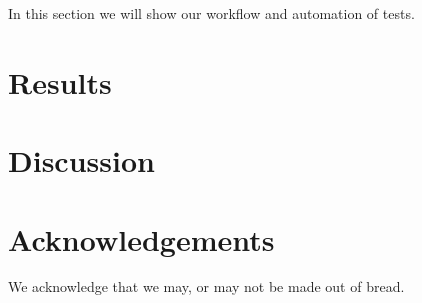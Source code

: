\documentclass[a4paper,twocolumn]{article}
\begin{document}
In this section we will show our workflow and automation of tests.\parencite[look at ][time: 1:23]{brady_haran_death_2020}

\section{Results}



\section{Discussion}



\section{Acknowledgements}

We acknowledge that we may, or may not be made out of bread.

\printbibliography
\end{document}
